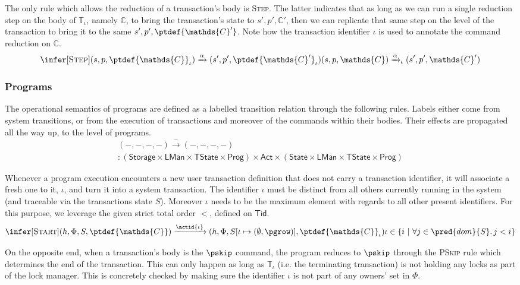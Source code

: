 The only rule which allows the reduction of a transaction's body is \textsc{Step}. The latter indicates that as long as we can run a single reduction step on the body of $\mathds{T}_\iota$, namely $\mathds{C}$, to bring the transaction's state to $s', p', \mathds{C}'$, then we can replicate that same step on the level of the transaction to bring it to the same $s', p', \ptdef{\mathds{C}'}$. Note how the transaction identifier $\iota$ is used to annotate the command reduction on $\mathds{C}$.
\[
\infer[\textsc{Step}]
{
	(s, p, \ptdef{\mathds{C}}_\iota)
	\xrightarrow{\alpha}
	(s', p', \ptdef{\mathds{C}'}_\iota)
}
{
	(s, p, \mathds{C})
	\xrightarrow{\alpha}_\iota
	(s', p', \mathds{C}')
}
\]

\subsubsection{Programs}

The operational semantics of programs are defined as a labelled transition relation through the following rules. Labels either come from system transitions, or from the execution of transactions and moreover of the commands within their bodies. Their effects are propagated all the way up, to the level of programs.
\begin{gather*}
(-, -, -, -) \xrightarrow{-} (-, -, -, -) \\
:
\left( \mathsf{Storage} \times \mathsf{LMan} \times \mathsf{TState} \times \mathsf{Prog} \right)
\times \mathsf{Act} \times
\left( \mathsf{State} \times \mathsf{LMan} \times \mathsf{TState} \times \mathsf{Prog} \right)
\end{gather*}

Whenever a program execution encounters a new user transaction definition that does not carry a transaction identifier, it will associate a fresh one to it, $\iota$, and turn it into a system transaction. The identifier $\iota$ must be distinct from all others currently running in the system (and traceable via the transactions state $S$). Moreover $\iota$ needs to be the maximum element with regards to all other present identifiers. For this purpose, we leverage the given strict total order $<$, defined on $\mathsf{Tid}$.
\[
	\infer[\textsc{Start}]
	{
		(h, \Phi, S, \ptdef{\mathds{C}})
		\xrightarrow{\actid{\iota}}
		(h, \Phi, S[\iota \mapsto (\emptyset, \pgrow)], \ptdef{\mathds{C}}_\iota)
	}
	{
		\iota \in \{ i\ |\ \forall j \in \pred{dom}{S} \ldotp j < i \}
	}
\]

On the opposite end, when a transaction's body is the $\pskip$ command, the program reduces to $\pskip$ through the \textsc{PSkip} rule which determines the end of the transaction. This can only happen as long as $\mathds{T}_\iota$ (i.e. the terminating transaction) is not holding any locks as part of the lock manager. This is concretely checked by making sure the identifier $\iota$ is not part of any owners' set in $\Phi$.

